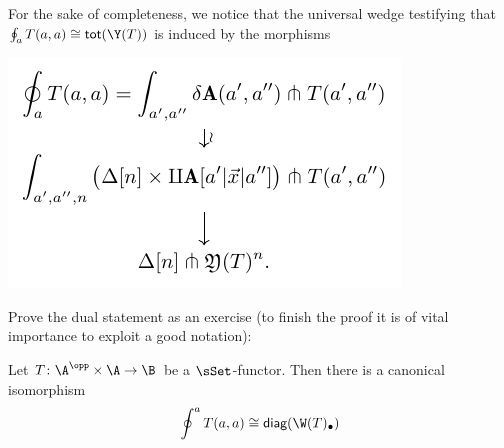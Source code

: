 For the sake of completeness, we notice that the universal wedge testifying that $\oint_a T(a,a) \cong \textsf{tot}(\Y(T))$ is induced by the morphisms
\begin{center}
\includegraphics[scale=1]{figures/fig13}
\end{center}
Prove the dual statement as an exercise (to finish the proof it is of vital importance to exploit a good notation):
\begin{proposition}
Let $T\colon \A^\opp\times \A \to \B$ be a $\sSet$-functor. Then there is a canonical isomorphism
\[
\oint^a T(a,a) \cong \textsf{diag}(\W(T)_\bullet)
\]
\end{proposition}
